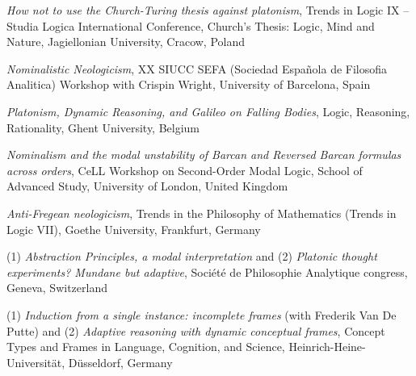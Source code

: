 \documentclass[10pt, a4paper]{article}
\newcommand{\years}[1]{\marginnote{\normalsize #1}}
\begin{document}
\emph{How not to use the Church-Turing thesis against platonism}, Trends in Logic IX -- Studia Logica International Conference, Church's Thesis: Logic, Mind and Nature,  Jagiellonian University, Cracow, Poland


\vspace{0.5mm}


 \emph{Nominalistic Neologicism},  XX SIUCC SEFA (Sociedad Espa\~ nola de Filosofia Analitica) Workshop with Crispin Wright,    University of  Barcelona, Spain


\vspace{0.5mm}



\years{2010} \emph{Platonism,   Dynamic   Reasoning,   and   Galileo   on   Falling   Bodies}, Logic,   Reasoning,   Rationality,  Ghent   University,
Belgium



\vspace{0.5mm}




  \emph{Nominalism and the modal unstability of Barcan and Reversed Barcan formulas across orders},     CeLL Workshop on Second-Order Modal Logic,  School of Advanced Study, University of London, United Kingdom

\vspace{0.5mm}



  \years{2009} \emph{Anti-Fregean neologicism}, Trends in the Philosophy of Mathematics (Trends in Logic VII),     Goethe University, Frankfurt, Germany


\vspace{0.5mm}


  (1) \emph{Abstraction Principles, a modal interpretation} and (2)   \emph{Platonic  thought   experiments?  Mundane   but  adaptive}, Soci\'et\'e de Philosophie Analytique  congress,
    Geneva, Switzerland


\vspace{0.5mm}



(1)  \emph{Induction from a single instance: incomplete frames} (with Frederik Van De Putte) and (2)   \emph{Adaptive reasoning with dynamic conceptual frames},
  Concept Types and Frames in Language, Cognition, and Science,      Heinrich-Heine-Universit\" at, D\"usseldorf, Germany


\vspace{0.5mm}
\end{document}
